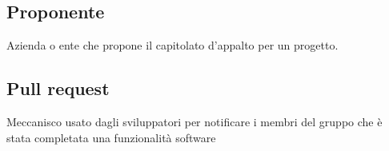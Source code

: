 \documentclass[../glossario.tex]{subfiles}
\begin{document}
\subsection*{Proponente} 
Azienda o ente che propone il capitolato d'appalto per un progetto.

\subsection*{Pull request} 
Meccanisco usato dagli sviluppatori per notificare i membri del gruppo che è stata completata una funzionalità software



    
\end{document}
